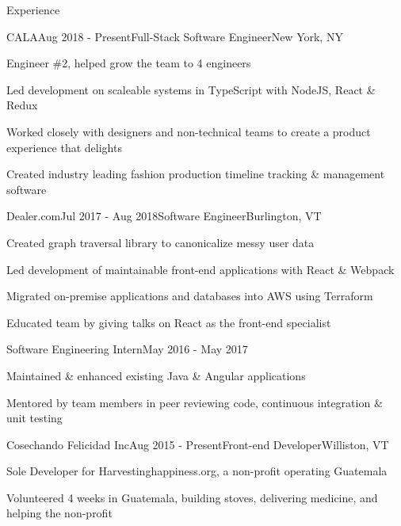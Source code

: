 \documentclass{resume} %
\begin{document}

\begin{rSection}{Experience}


\begin{rSubsection}{CALA}{Aug 2018 - Present}{Full-Stack Software Engineer}{New York, NY}
    \item Engineer \#2, helped grow the team to 4 engineers
    \item Led development on scaleable systems in TypeScript with NodeJS, React \& Redux
    \item Worked closely with designers and non-technical teams to create a product experience that delights
    \item Created industry leading fashion production timeline tracking \& management software
\end{rSubsection}


\begin{rSubsection}{Dealer.com}{Jul 2017 - Aug 2018}{Software Engineer}{Burlington, VT}
    \item Created graph traversal library to canonicalize messy user data
    \item Led development of maintainable front-end applications with React \& Webpack
    \item Migrated on-premise applications and databases into AWS using Terraform
    \item Educated team by giving talks on React as the front-end specialist
\end{rSubsection}

\begin{sSubsection}{Software Engineering Intern}{May 2016 - May 2017}
    \item Maintained \& enhanced existing Java \& Angular applications
    \item Mentored by team members in peer reviewing code, continuous integration \& unit testing
\end{sSubsection}


\begin{rSubsection}{Cosechando Felicidad Inc}{Aug 2015 - Present}{Front-end Developer}{Williston, VT}
    \item Sole Developer for Harvestinghappiness.org, a non-profit operating Guatemala
    \item Volunteered 4 weeks in Guatemala, building stoves, delivering medicine, and helping the non-profit
\end{rSubsection}


\end{rSection}
\end{document}
